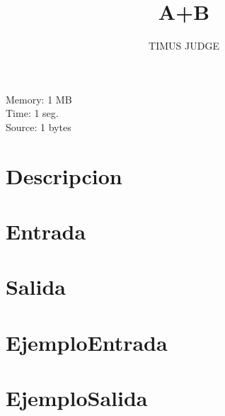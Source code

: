 \documentclass{article}
\title{\textbf{A+B}}
\author{TIMUS JUDGE}
\begin{document}
\maketitle
\begin{center}
Memory: 1 MB\\
Time: 1 seg.\\
Source: 1 bytes\\
\end{center}
\section*{Descripcion}

\section*{Entrada}

\section*{Salida}

\section*{EjemploEntrada}
\texttt{}
\section*{EjemploSalida}
\texttt{}
\end{document}
